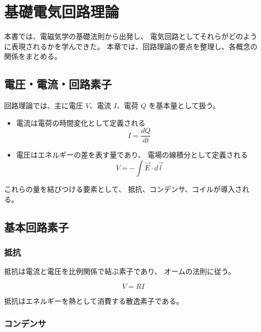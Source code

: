 \chapter{基礎電気回路理論}


本書では、電磁気学の基礎法則から出発し、
電気回路としてそれらがどのように表現されるかを学んできた。
本章では、回路理論の要点を整理し、各概念の関係をまとめる。

\section{電圧・電流・回路素子}

回路理論では、主に電圧 $V$、電流 $I$、電荷 $Q$ を基本量として扱う。

\begin{itemize}
\item 電流は電荷の時間変化として定義される
\begin{equation}
I = \frac{dQ}{dt}
\end{equation}

\item 電圧はエネルギーの差を表す量であり、
電場の線積分として定義される
\begin{equation}
V = -\int \vec{E} \cdot d\vec{l}
\end{equation}
\end{itemize}

これらの量を結びつける要素として、
抵抗、コンデンサ、コイルが導入される。



\section{基本回路素子}

\subsection{抵抗}

抵抗は電流と電圧を比例関係で結ぶ素子であり、
オームの法則に従う。

\begin{equation}
V = RI
\end{equation}

抵抗はエネルギーを熱として消費する散逸素子である。



\subsection{コンデンサ}


